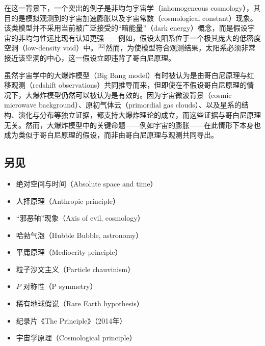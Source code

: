 在这一背景下，一个突出的例子是非均匀宇宙学（inhomogeneous cosmology），其目的是模拟观测到的宇宙加速膨胀以及宇宙常数（cosmological constant）现象。该类模型并不采用当前被广泛接受的“暗能量”（dark energy）概念，而是假设宇宙的非均匀性远比现有认知更强——例如，假设太阳系位于一个极其庞大的低密度空洞（low-density void）中。\(^\text{[32]}\)然而，为使模型符合观测结果，太阳系必须非常接近该空洞的中心，这一假设立即违背了哥白尼原理。

虽然宇宙学中的大爆炸模型（Big Bang model）有时被认为是由哥白尼原理与红移观测（redshift observations）共同推导而来，但即使在不假设哥白尼原理的情况下，大爆炸模型仍然可以被认为是有效的。因为宇宙微波背景（cosmic microwave background）、原初气体云（primordial gas clouds）、以及星系的结构、演化与分布等独立证据，都支持大爆炸理论的成立，而这些证据与哥白尼原理无关。然而，大爆炸模型中的关键命题——例如宇宙的膨胀——在此情形下本身也成为类似于哥白尼原理的假设，而非由哥白尼原理与观测共同导出。
\subsection{另见}
\begin{itemize}
\item 绝对空间与时间（Absolute space and time）
\item 人择原理（Anthropic principle）
\item “邪恶轴”现象（Axis of evil, cosmology） 
\item 哈勃气泡（Hubble Bubble, astronomy） 
\item 平庸原理（Mediocrity principle）
\item 粒子沙文主义（Particle chauvinism）
\item $P$ 对称性（P symmetry）
\item 稀有地球假说（Rare Earth hypothesis）
\item 纪录片《The Principle》（2014年）
\item 宇宙学原理（Cosmological principle）
\end{itemize}
